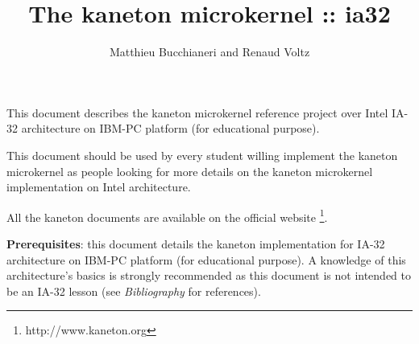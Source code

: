 %
%
%
%
%
%

%
%

\def\path{../../..}

%
%



%
%

\rhead{}

%
%

\title{The kaneton microkernel :: ia32
       \logos}

%
%

\author{\small{Matthieu Bucchianeri} and
        \small{Renaud Voltz}}

%
%



%
%

\maketitle

%
%

This document describes the kaneton microkernel reference project over
Intel IA-32 architecture on IBM-PC platform (for educational purpose).

This document should be used by every student willing implement the
kaneton microkernel as people looking for more details on the kaneton
microkernel implementation on Intel architecture.

All the kaneton documents are available on
the official website
  \footnote{http://www.kaneton.org}.

\textbf{Prerequisites}: this document details the kaneton implementation
for IA-32 architecture on IBM-PC platform (for educational purpose). A
knowledge of this architecture's basics is strongly recommended as
this document is not intended to be an IA-32 lesson (see
\textit{Bibliography} for references).

%
%

\toc

%
%













